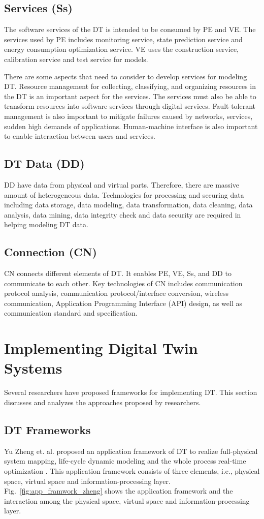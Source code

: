 \documentclass[article]{aaltoseries}
\begin{document}
\subsection{Services (Ss)}
The software services of the DT is intended to be consumed by PE and VE. The services used by PE includes monitoring service, state prediction service and energy consumption optimization service. VE uses the construction service, calibration service and test service for models.

There are some aspects that need to consider to develop services for modeling DT. Resource management for collecting, classifying, and organizing resources in the DT is an important aspect for the services. The services must also be able to transform resources into software services through digital services. Fault-tolerant management is also important to mitigate failures caused by networks, services, sudden high demands of applications. Human-machine interface is also important to enable interaction between users and services.

\subsection{DT Data (DD)}
DD have data from physical and virtual parts. Therefore, there are massive amount of heterogeneous data. Technologies for processing and securing data including data storage, data modeling, data transformation, data cleaning, data analysis, data mining, data integrity check and data security are required in helping modeling DT data.

\subsection{Connection (CN)}
CN connects different elements of DT. It enables PE, VE, Ss, and DD to communicate to each other. Key technologies of CN includes communication protocol analysis, communication protocol/interface conversion, wireless communication, Application Programming Interface (API) design, as well as communication standard and specification.

\section{Implementing Digital Twin Systems}
Several researchers have proposed frameworks for implementing DT. This section discusses and analyzes the approaches proposed by researchers.

\subsection{DT Frameworks}
Yu Zheng et. al. proposed an application framework of DT to realize full-physical system mapping, life-cycle dynamic modeling and the whole process real-time optimization \cite{zheng2019application}. This application framework consists of three elements, i.e., physical space, virtual space and information-processing layer. Fig.~\ref{fig:app_framwork_zheng} shows the application framework and the interaction among the physical space, virtual space and information-processing layer.
\end{document}
